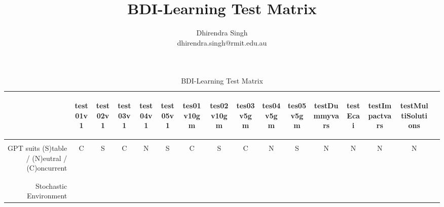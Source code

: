 \documentclass[landscape,a4paper,title page]{article}
\title{BDI-Learning Test Matrix}
\author{
Dhirendra Singh\\ 
dhirendra.singh@rmit.edu.au\\
}
\newcommand{\x}{{\checked}}
\begin{document}
\maketitle

\begin{table}[!htb]
  \caption{BDI-Learning Test Matrix}
  \begin{tabular}{ r | c  c  c  c  c  c  c  c  c  c  c  c  c  c  c }
  \begin{turn}{60}\end{turn} &
  \begin{turn}{60} test01v1 \end{turn} &
  \begin{turn}{60} test02v1 \end{turn} &
  \begin{turn}{60} test03v1 \end{turn} &
  \begin{turn}{60} test04v1 \end{turn} &
  \begin{turn}{60} test05v1 \end{turn} &
  \begin{turn}{60} tes01v10gm \end{turn} &
  \begin{turn}{60} tes02v10gm \end{turn} &
  \begin{turn}{60} tes03v5gm \end{turn} &
  \begin{turn}{60} tes04v5gm \end{turn} &
  \begin{turn}{60} tes05v5gm \end{turn} &
  \begin{turn}{60} testDummyvars \end{turn} &
  \begin{turn}{60} testEcai \end{turn} &
  \begin{turn}{60} testImpactvars \end{turn} &
  \begin{turn}{60} testMultiSolutions \end{turn}
  \\ \hline \\
  GPT suits (S)table / (N)eutral / (C)oncurrent & C & S & C & N & S & C & S & C & N & S & N & N & N & N \\
  \\ \hline \\
  Stochastic Environment & \x & \x & \x & \x & \x & \x & \x & \x & \x & \x & \x & \x & \x & \x \\

\end{tabular}
\end{table}
\end{document}
